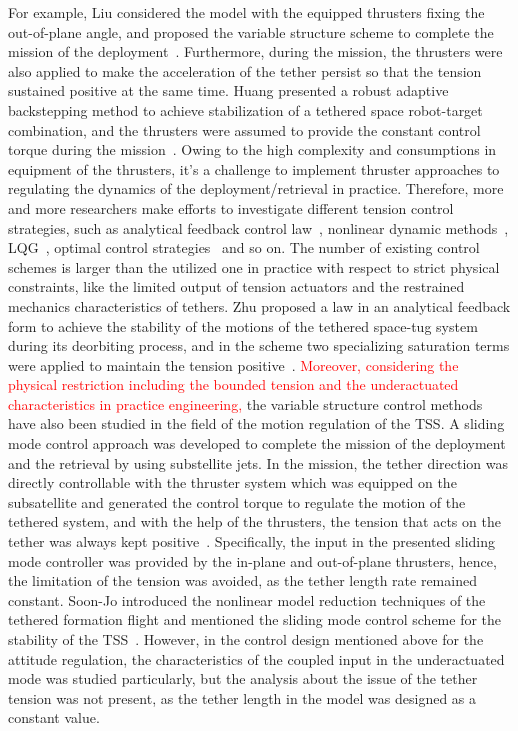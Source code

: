 \documentclass[3p]{elsarticle}
\theoremstyle{plain}
\begin{document}
For example, Liu considered the model with the equipped thrusters fixing the out-of-plane angle, and proposed the variable structure scheme to complete the mission of the deployment~\cite{yingying2012variable}. Furthermore, during the mission, the thrusters were also applied to make the acceleration of the tether persist so that the tension sustained positive at the same time. Huang presented a robust adaptive backstepping method to achieve stabilization of a tethered space robot-target combination, and the thrusters were assumed to provide the constant control torque during the mission~\cite{huang2015adaptive}. Owing to the high complexity and consumptions in equipment of the thrusters, it's a challenge to implement thruster approaches to regulating the dynamics of the deployment/retrieval in practice. Therefore, more and more researchers make efforts to investigate different tension control strategies, such as analytical feedback control law~\cite{wen2015space}, nonlinear dynamic methods~\cite{jung2015nonlinear}, LQG~\cite{yousefian2015anti}, optimal control strategies~\cite{steindl2015optimal,Williams2009745} and so on. The number of existing control schemes is larger than the utilized one in practice with respect to strict physical constraints, like the limited output of tension actuators and the restrained mechanics characteristics of tethers. Zhu proposed a law in an analytical feedback form to achieve the stability of the motions of the tethered space-tug system during its deorbiting process, and in the scheme two specializing saturation terms were applied to maintain the tension positive~\cite{wen2016constrained}. \textcolor{red}{Moreover, considering the physical restriction including the bounded tension and the underactuated characteristics in practice engineering,} the variable structure control methods have also been studied in the field of the motion regulation of the TSS. A sliding mode control approach was developed to complete the mission of the deployment and the retrieval by using substellite jets. In the mission, the tether direction was directly controllable with the thruster system which was equipped on the subsatellite and generated the control torque to regulate the motion of the tethered system, and with the help of the thrusters, the tension that acts on the tether was always kept positive~\cite{yingying2012variable}.
Specifically, the input in the presented sliding mode controller was provided by the in-plane and out-of-plane thrusters, hence, the limitation of the tension was avoided, as the tether length rate remained constant. Soon-Jo introduced the nonlinear model reduction techniques of the tethered formation flight and mentioned the sliding mode control scheme for the stability of the TSS~\cite{chung2007nonlinear,chung2008propellant2}. However, in the control design mentioned above for the attitude regulation, the characteristics of the coupled input in the underactuated mode was studied particularly, but the analysis about the issue of the tether tension was not present, as the tether length in the model was designed as a constant value.\par
\end{document}
